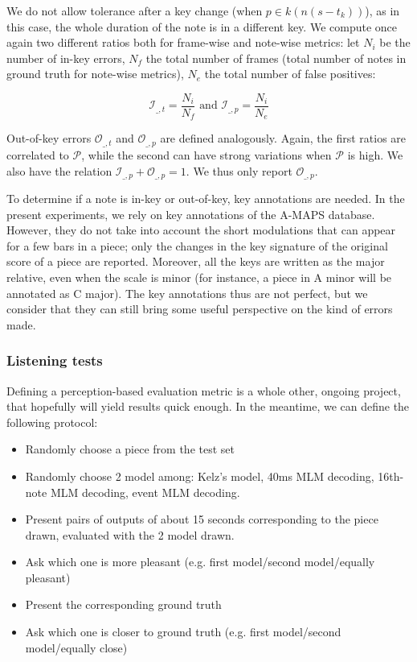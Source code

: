 \documentclass{article}
\begin{document}
\vspace{-0.2cm}
We do not allow tolerance after a key change (when $p \in k(n(s - t_k))$), as in this case, the whole duration of the note is in a different key. We compute once again two different ratios both for frame-wise and note-wise metrics:  
let $N_i$  be the number of in-key errors, $N_f$ the total number of frames (total number of notes in ground truth for note-wise metrics), $N_e$ the total number of false positives:

\vspace{-0.35cm}
\[
\mathcal{I}_{\_,t} = \frac{N_i}{N_f} \textrm{ and } 
\mathcal{I}_{\_,p} = \frac{N_i}{N_e}
\]

\vspace{-0.10cm}
Out-of-key errors $\mathcal{O}_{\_,t}$ and $\mathcal{O}_{\_,p}$ are defined analogously.
Again, the first ratios are correlated to $\mathcal{P}$, while the second can have strong variations when $\mathcal{P}$ is high. 
We also have the relation $\mathcal{I}_{\_,p} + \mathcal{O}_{\_,p} = 1$. We thus only report $\mathcal{O}_{\_,p}$.

To determine if a note is in-key or out-of-key, key annotations are needed.
In the present experiments, we rely on key annotations of the A-MAPS database. 
However, they do not take into account the short modulations that can appear for a few bars in a piece; only the changes in the key signature of the original score of a piece are reported.
Moreover, all the keys are written as the major relative, even when the scale is minor (for instance, a piece in A minor will be annotated as C major).
The key annotations thus are not perfect, but we consider that they can still bring some useful perspective on the kind of errors made.

\subsubsection{Listening tests}
\label{sec:listening}

Defining a perception-based evaluation metric is a whole other, ongoing project, that hopefully will yield results quick enough.
In the meantime, we can define the following protocol:

\begin{itemize}
\item Randomly choose a piece from the test set
\item Randomly choose 2 model among: Kelz's model, 40ms MLM decoding, 16th-note MLM decoding, event MLM decoding.
\item Present pairs of outputs of about 15 seconds corresponding to the piece drawn, evaluated with the 2 model drawn.
\item Ask which one is more pleasant (e.g. first model/second model/equally pleasant)
\item Present the corresponding ground truth 
\item Ask which one is closer to ground truth (e.g. first model/second model/equally close)
\end{itemize}
\end{document}
